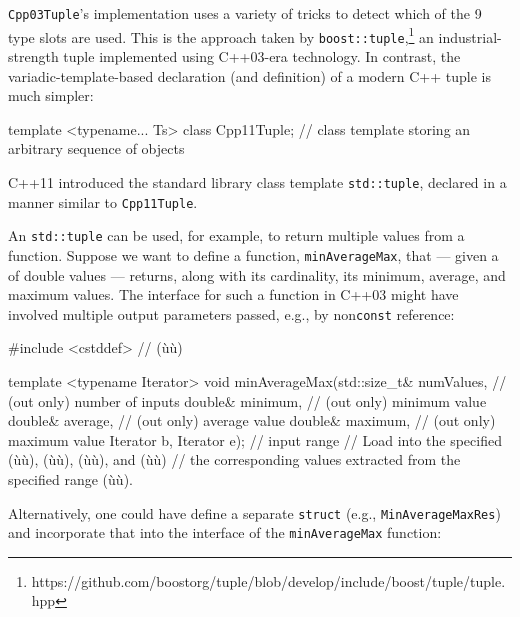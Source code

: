 \lstinline!Cpp03Tuple!'s implementation uses a variety of
 tricks to detect which of the 9 type slots are
used. This is the approach taken by
\lstinline!boost::tuple!,{\cprotect\footnote{https://github.com/boostorg/tuple/blob/develop/include/boost/tuple/tuple.hpp}}
an industrial-strength tuple implemented using C++03-era technology. In
contrast, the variadic-template-based declaration (and definition) of a
modern C++ tuple is much simpler:

\begin{emcppslisting}
template <typename... Ts>
class Cpp11Tuple;  // class template storing an arbitrary sequence of objects
\end{emcppslisting}
    

\noindent C++11 introduced the standard library class template
\lstinline!std::tuple!, declared in a manner similar to
\lstinline!Cpp11Tuple!.

An \lstinline!std::tuple! can be used, for example, to return multiple
values from a function. Suppose we want to define a function,
\lstinline!minAverageMax!, that --- given a  of double values
--- returns, along with its cardinality, its minimum, average, and
maximum values. The interface for such a function in C++03 might have
involved multiple output parameters passed, e.g., by non\lstinline!const!
 reference:

\begin{emcppslisting}
#include <cstddef>  // (ù{}ù)

template <typename Iterator>
void minAverageMax(std::size_t& numValues,   // (out only) number of inputs
                   double& minimum,          // (out only) minimum value
                   double& average,          // (out only) average value
                   double& maximum,          // (out only) maximum value
                   Iterator b, Iterator e);  // input range
    // Load into the specified (ù{}ù), (ù{}ù), (ù{}ù), and (ù{}ù)
    // the corresponding values extracted from the specified range (ù{\codeincomments{[b, e)}}ù).
\end{emcppslisting}
    

\noindent Alternatively, one could have define a separate \lstinline!struct! (e.g.,
\lstinline!MinAverageMaxRes!) and incorporate that into the interface of
the \lstinline!minAverageMax! function:

